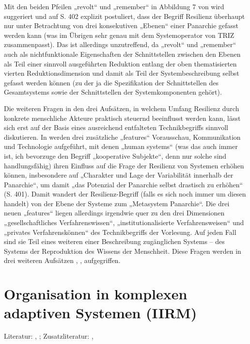 \documentclass[11pt,a4paper]{article}
\begin{document}
Mit den beiden Pfeilen „revolt“ und „remember“ in Abbildung 7 von
\cite{Holling2000} wird suggeriert und auf S. 402 explizit postuliert, dass
der Begriff Resilienz überhaupt nur unter Betrachtung von drei konsekutiven
„Ebenen“ einer Panarchie gefasst werden kann (was im Übrigen sehr genau mit
dem Systemoperator von TRIZ zusammenpasst). Das ist allerdings unzutreffend,
da „revolt“ und „remember“ auch als nichtfunktionale Eigenschaften der
Schnittstellen zwischen den Ebenen als Teil einer sinnvoll ausgeführten
Reduktion entlang der oben thematisierten vierten Reduktionsdimension und
damit als Teil der Systembeschreibung selbst gefasst werden können (zu der ja
die Spezifikation der Schnittstellen des Gesamtsystems sowie der
Schnittstellen der Systemkomponenten gehört).

Die weiteren Fragen in den drei Aufsätzen, in welchem Umfang Resilienz durch
konkrete menschliche Akteure praktisch steuernd beeinflusst werden kann, lässt
sich erst auf der Basis eines ausreichend entfalteten Technikbegriffs sinnvoll
diskutieren. In \cite{Holling2000} werden drei zusätzliche „features“
Vorausschau, Kommunikation und Technologie aufgeführt, mit denen „human
systems“ (was das auch immer ist, ich bevorzuge den Begriff „kooperative
Subjekte“, denn nur solche sind handlungsfähig) ihren Einfluss auf die Frage
der Resilienz von Systemen erhöhen können, insbesondere auf „Charakter und
Lage der Variabilität innerhalb der Panarchie“, um damit „das Potenzial der
Panarchie selbst drastisch zu erhöhen“ (S. 401). Damit wandert der
Resilienz-Begriff (falls es sich noch immer um diesen handelt) von der Ebene
der Systeme zum „Metasystem Panarchie“. Die drei neuen „features“ liegen
allerdings irgendwie quer zu den drei Dimensionen „gesellschaftliches
Verfahrenswissen“, „institutionalisierte Verfahrensweisen“ und „privates
Verfahrenskönnen“ des Technikbegriffs der Vorlesung. Auf jeden Fall sind sie
Teil eines weiteren einer Beschreibung zugänglichen Systems -- des Systems der
Reproduktion des Wissens der Menschheit. Diese Fragen werden in drei weiteren
Aufsätzen \cite{Stollorz2011}, \cite{Helfrich2011}, \cite{Dobusch2011}
aufgegriffen.

\section{Organisation in komplexen adaptiven Systemen (IIRM)}

Literatur: \cite{Ashby1958}, \cite{Boisot2011}; Zusatzliteratur:
\cite{Holland2006}, \cite{Jacobasch2019}
\end{document}
